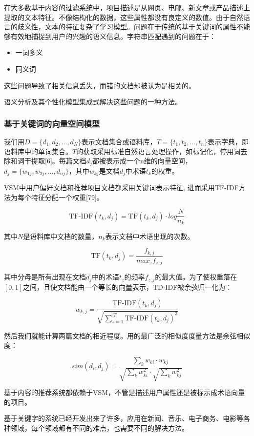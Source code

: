 在大多数基于内容的过滤系统中，项目描述是从网页、电邮、新文章或产品描述上提取的文本特征。不像结构化的数据，这些属性都没有良定义的数值。由于自然语言的歧义性，文本的特征复杂了学习模型。问题在于传统的基于关键词的属性不能够有效地捕捉到用户的兴趣的语义信息。字符串匹配遇到的问题在于：
\begin{itemize}
	\item 一词多义
	\item 同义词
\end{itemize}

这些问题导致了相关信息丢失，而错的文档却被认为是相关的。

语义分析及其个性化模型集成式解决这些问题的一种方法。

\subsubsection{基于关键词的向量空间模型}
我们用$D=\{d_1,d_2,\dots,d_N\}$表示文档集合或语料库，$T=\{t_1,t_2,\dots,t_n\}$表示字典，即语料库中的单词集合。$T$的获取采用标准自然语言处理操作，如标记化，停用词去除和词干提取[6]。每篇文档$d_j$都被表示成一个n维的向量空间，$d_j=\{w_{1j},w_{2j},\dots,d_{nj}\}$，其中$w_{kj}$是文档$d_j$中术语$t_k$的权重。

VSM中用户偏好文档和推荐项目文档都采用关键词表示特征, 进而采用TF-IDF方法为每个特征分配一个权重[79]。

$$ \textrm{TF-IDF}(t_k,d_j)=\textrm{TF}(t_k,d_j)\cdot log\frac{N}{n_k} $$

其中$N$是语料库中文档的数量，$n_k$表示文档中术语出现的次数。

$$ \textrm{TF}(t_k,d_j)=\frac{f_{k,j}}{max_zf_{z,j}} $$

其中分母是所有出现在文档$d_j$中的术语$t_z$的频率$f_{z,j}$的最大值。为了使权重落在$[0,1]$之间，且使文档能由一个等长的向量表示，TD-IDF被余弦归一化为：

$$ w_{k,j}=\frac{\textrm{TF-IDF}(t_k,d_j)}{\sqrt{\sum_{s=1}^{|T|}\textrm{TF-IDF}(t_k,d_j)^2}} $$

然后我们就能计算两篇文档的相近程度。用的最广泛的相似度度量方法是余弦相似度：

$$ sim(d_i,d_j)=\frac{\sum_kw_{ki}\cdot w_{kj}}{\sqrt{\sum_kw_{ki}^2}\cdot\sqrt{\sum_kw_{kj}^2}} $$

基于内容的推荐系统都依赖于VSM，不管是描述用户属性还是被标示成术语向量的项目。

基于关键字的系统已经开发出来了许多，应用在新闻、音乐、电子商务、电影等各种领域，每个领域都有不同的难点，也需要不同的解决方法。

